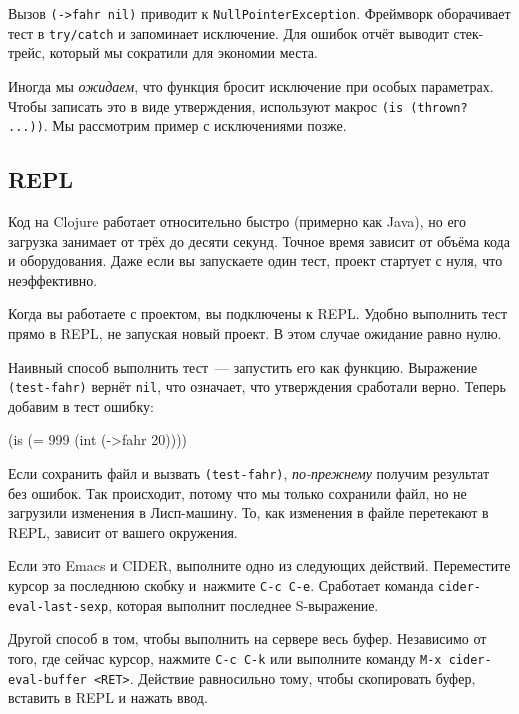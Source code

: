 \fi


Вызов \verb|(->fahr nil)| приводит к \verb|NullPointerException|. Фреймворк
оборачивает тест в \verb|try/catch| и запоминает исключение. Для ошибок отчёт
выводит стек-трейс, который мы сократили для экономии места.

Иногда мы \emph{ожидаем}, что функция бросит исключение при особых
параметрах. Чтобы записать это в виде утверждения, используют макрос
\verb|(is (thrown? ...))|. Мы рассмотрим пример с исключениями позже.

\subsection{REPL}


Код на Clojure работает относительно быстро (примерно как Java), но его загрузка
занимает от трёх до десяти секунд. Точное время зависит от объёма кода и
оборудования. Даже если вы запускаете один тест, проект стартует с нуля, что
неэффективно.

Когда вы работаете с проектом, вы подключены к REPL. Удобно выполнить тест прямо
в REPL, не запуская новый проект. В этом случае ожидание равно нулю.

Наивный способ выполнить тест~--- запустить его как функцию. Выражение
\verb|(test-fahr)| вернёт \verb|nil|, что означает, что утверждения
сработали верно. Теперь добавим в тест ошибку:

\begin{english}
  \begin{clojure}
(is (= 999 (int (->fahr 20))))
  \end{clojure}
\end{english}

Если сохранить файл и вызвать \verb|(test-fahr)|, \emph{по-прежнему} получим
результат без ошибок. Так происходит, потому что мы только сохранили файл, но не
загрузили изменения в Лисп-машину. То, как изменения в файле перетекают в REPL,
зависит от вашего окружения.


Если это Emacs и CIDER, выполните одно из следующих действий. Переместите курсор
за последнюю скобку  и~нажмите
\verb|C-c C-e|. Сработает команда \verb|cider-eval-last-sexp|, которая выполнит
последнее S-выражение.

Другой способ в том, чтобы выполнить на сервере весь буфер. Независимо от того,
где сейчас курсор, нажмите \verb|C-c C-k| или выполните команду
\verb|M-x cider-eval-buffer <RET>|. Действие равносильно тому, чтобы скопировать
буфер, вставить в REPL и нажать ввод.

